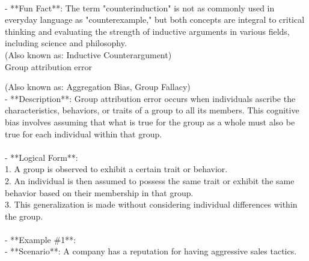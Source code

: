\documentclass[a4paper,12pt,single,pdftex]{scrartcl}
\begin{document}
    
      
    \\

    
      - **Fun Fact**: The term "counterinduction" is not as commonly used in everyday language as "counterexample," but both concepts are integral to critical thinking and evaluating the strength of inductive arguments in various fields, including science and philosophy.
    \\

  
    
      (Also known as: Inductive Counterargument)
    \\

  

Group attribution error
    
      (Also known as: Aggregation Bias, Group Fallacy)
    \\

  
    
      - **Description**: Group attribution error occurs when individuals ascribe the characteristics, behaviors, or traits of a group to all its members. This cognitive bias involves assuming that what is true for the group as a whole must also be true for each individual within that group.
    \\

    
      
    \\

    
      - **Logical Form**:
    \\

    
        1. A group is observed to exhibit a certain trait or behavior.
    \\

    
        2. An individual is then assumed to possess the same trait or exhibit the same behavior based on their membership in that group.
    \\

    
        3. This generalization is made without considering individual differences within the group.
    \\

    
      
    \\

    
      - **Example \#1**:
    \\

    
        - **Scenario**: A company has a reputation for having aggressive sales tactics.
    \\
\end{document}
